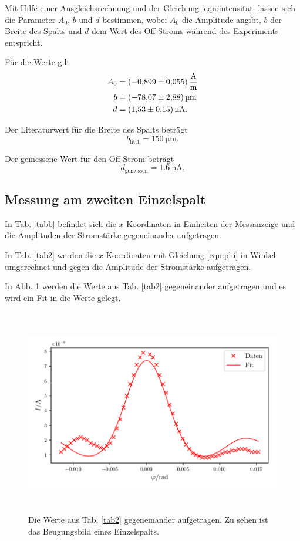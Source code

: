 \noindent Mit Hilfe einer Ausgleichsrechnung und der Gleichung \eqref{eqn:intensität} lassen sich die Parameter $A_0$, $b$ und $d$ bestimmen, wobei $A_0$ die Amplitude angibt, $b$ der Breite des Spalts und $d$ dem Wert des Off-Stroms während des Experiments entspricht. 

\noindent Für die Werte gilt
\begin{align*}
    A_0 &= \SI{-0.899(055)}{\ampere\per\meter} \\
    b &= \SI{-78.07 \pm 2.88}{\micro\meter} \\
    d &= \SI{1.53(15)}{\nano\ampere}.
\end{align*}

\noindent Der Literaturwert für die Breite des Spalts beträgt
\begin{equation*}
    b_\text{lit,1} = \SI{150}{\micro\meter}.
\end{equation*}

\noindent Der gemessene Wert für den Off-Strom beträgt 
\begin{equation*}
    d_\text{gemessen}= \SI{1.6}{\nano\ampere}.
\end{equation*}


\subsection{Messung am zweiten Einzelspalt}
In Tab. \ref{tabb} befindet sich die $x$-Koordinaten in Einheiten der Messanzeige und die Amplituden der Stromstärke gegeneinander aufgetragen. 



\noindent In Tab. \ref{tab2} werden die $x$-Koordinaten mit Gleichung \eqref{eqn:phi} in Winkel umgerechnet und gegen die Amplitude der Stromstärke aufgetragen. 



\noindent In Abb. \ref{fig:plot2} werden die Werte aus Tab. \ref{tab2} gegeneinander aufgetragen und es wird ein Fit in die Werte gelegt. 
\begin{figure}
    \centering
    \includegraphics[width=15cm, height=9cm]{build/plot2.pdf}
    \caption{Die Werte aus Tab. \ref{tab2} gegeneinander aufgetragen.
    Zu sehen ist das Beugungsbild eines Einzelspalts.}
    \label{fig:plot2}
\end{figure}

